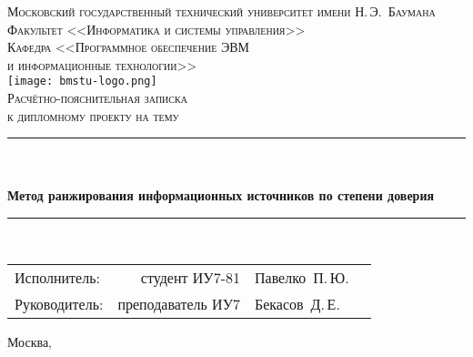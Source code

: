 \newcommand{\HRule}{\rule{\linewidth}{.5mm}\\}

\begin{center}

\textsc{\large Московский государственный технический университет имени Н.\,Э.~Баумана}\\[5mm]
\textsc{Факультет <<Информатика и системы управления>>}\\
\textsc{Кафедра <<Программное обеспечение ЭВМ\\и информационные технологии>>}\\[2.5mm]

\texttt{[image: bmstu-logo.png]}\\[2.25cm]

\textsc{\large Расчётно-пояснительная записка}\\
\textsc{к дипломному проекту на тему}

\HRule\\[5mm]
{\huge \bfseries Метод ранжирования информационных источников по степени доверия}
\HRule

\vfill

\begin{flushright}
  \begin{tabular}{lrlc}
    Исполнитель:  &    студент ИУ7-81 & Павелко~П.\,Ю. & \underline{\hspace{3cm}}\\[1cm]
    Руководитель: & преподаватель ИУ7 & Бекасов~Д.\,Е. & \underline{\hspace{3cm}}\\[1cm]
  \end{tabular}
\end{flushright}

{\large Москва, \the\year}

\end{center}

\newpage
{}
